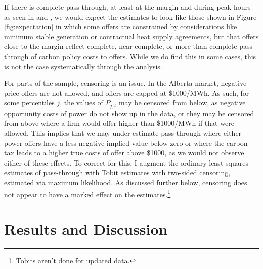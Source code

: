 \documentclass[12pt]{article}
\begin{document}
If there is complete pass-through, at least at the margin and during peak hours as seen in \cite{fabra_reguant} and \cite{hintermann16_germany}, we would expect the estimates to look like those shown in Figure \ref{fig:expectation} in which some offers are constrained by considerations like minimum stable generation or contractual heat supply agreements, but that offers close to the margin reflect complete, near-complete, or more-than-complete pass-through of carbon policy costs to offers.  While we do find this in some cases, this is not the case systematically through the analysis.

For parts of the sample, censoring is an issue. In the Alberta market, negative price offers are not allowed, and offers are capped at \$1000/MWh. As such, for some percentiles $j$, the values of $P_{j,t}$ may be censored from below, as negative opportunity costs of power do not show up in the data, or they may be censored from above where a firm would offer higher than \$1000/MWh if that were allowed. This implies that we may under-estimate pass-through where either power offers have a less negative implied value below zero or where the carbon tax leads to a higher true costs of offer above \$1000, as we would not observe either of these effects. To correct for this, I augment the ordinary least squares estimates of pass-through with Tobit estimates with two-sided censoring, estimated via maximum likelihood. As discussed further below, censoring does not appear to have a marked effect on the estimates.\footnote{Tobits aren't done for updated data.}

\section{Results and Discussion}\label{sec:results}
\end{document}
